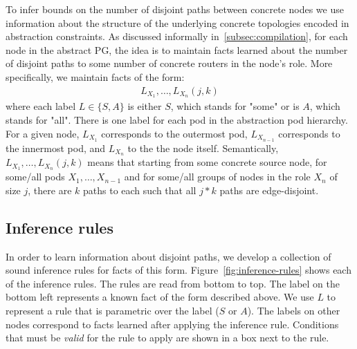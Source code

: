 \documentclass[numbers, 10pt, preprint]{sigplanconf}
\begin{document}

%
To infer bounds on the number of disjoint paths between concrete nodes we use information about the structure of the underlying concrete topologies encoded in abstraction constraints.
%
As discussed informally in~\ref{subsec:compilation},
for each node in the abstract PG,
the idea is to maintain facts learned about the number of disjoint paths
to some number of concrete routers in the node's role.
More specifically, we maintain facts of the form:
%
\[ \begin{array}{c}
  L_{X_1}, \ldots, L_{X_n}(j,k)
\end{array} \]
\noindent
%
where each label $L \in \{S,A\}$ is either $S$, which stands for "some" or is $A$, which stands for "all". There is one label for each pod in the abstraction pod hierarchy. For a given node, $L_{X_1}$ corresponds to the outermost pod, $L_{X_{n-1}}$ corresponds to the innermost pod, and $L_{X_n}$ to the the node itself.
Semantically, $L_{X_1}, \ldots, L_{X_n}(j,k)$ means that starting from some concrete source node, for some/all pods $X_1, \ldots, X_{n-1}$
and for some/all groups of nodes in the role $X_n$ of size $j$,
there are $k$ paths to each such that all $j*k$ paths are edge-disjoint.
%

\subsection{Inference rules}

\newcommand{\infrule}[1]{{\small \sf #1}\xspace}

In order to learn information about disjoint paths, we develop a collection of sound inference rules for facts of this form. Figure~\ref{fig:inference-rules} shows each of the inference rules. The rules are read from bottom to top. The label on the bottom left represents a known fact of the form described above. We use $L$ to represent a rule that is parametric over the label ($S$ or $A$). The labels on other nodes correspond to facts learned after applying the inference rule. Conditions that must be \emph{valid} for the rule to apply are shown in a box next to the rule.
\end{document}
